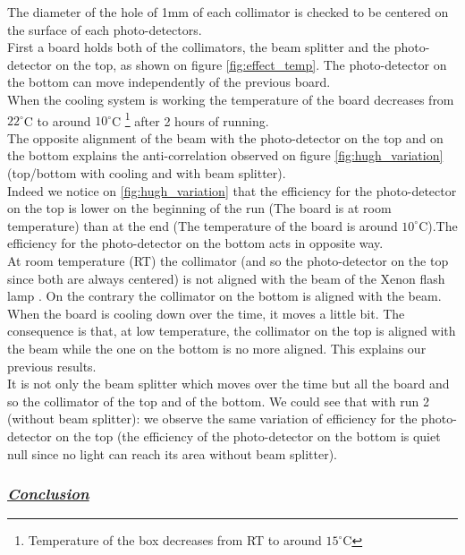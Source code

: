 \documentclass[a4paper, 11pt]{report}%
\newcommand{\xfl}{Xenon flash lamp }
\begin{document}
  The diameter of the hole of 1mm of each collimator is checked to be centered on the surface of each photo-detectors.
  \\
  
  First a board holds both of the collimators, the beam splitter and the photo-detector on the top, as shown on figure \ref{fig:effect_temp}. 
  The photo-detector on the bottom can move independently of the previous board.\\
  When the cooling system is working the temperature of the board decreases from $22^\circ$C to around $10^\circ$C 
  \footnote{Temperature of the box decreases from RT to around $15^\circ$C} after 2 hours of running.   
  \\
    
  The opposite alignment of the beam with the photo-detector on the top and on the bottom explains the anti-correlation observed on figure 
  \ref{fig:hugh_variation} (top/bottom with cooling and with beam splitter).\\
  Indeed we notice on \ref{fig:hugh_variation} that the efficiency for the  photo-detector on the top is lower on the beginning of the run 
  (The board is at room temperature) than at the end (The temperature of the board is around $10^\circ$C).The efficiency for the photo-detector
  on the bottom acts in opposite way.\\
  At room temperature (RT) the collimator (and so the photo-detector on the top since both are always centered) is not aligned with the beam
  of the \xfl. On the contrary the collimator on the bottom is aligned with the beam. When the board is cooling down over the time, 
  it moves a little bit. The consequence is that, at low temperature, the collimator on the top is aligned with the beam while the one on the bottom is no more
  aligned. This explains our previous results. 
  \\
 
  It is not only the beam splitter which moves over the time but all the board and so the collimator of the top and of the bottom.
  We could see
  that with run 2 (without beam splitter): we observe the same variation of efficiency for the photo-detector on the top (the efficiency 
  of the photo-detector on the bottom is quiet null since no light can reach its area without beam splitter). 
 
  \subsubsection{\textit{\underline{Conclusion}}}
  
\end{document}
